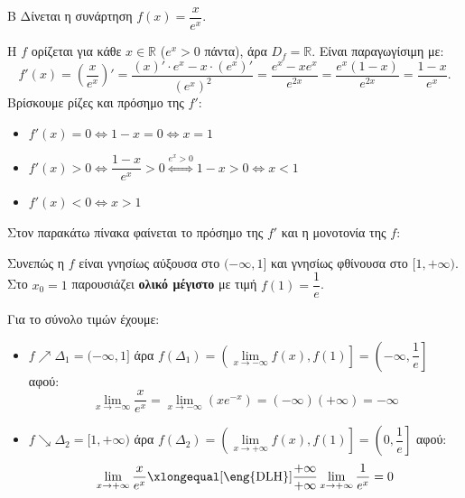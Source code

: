 \begin{thema}{Β}
Δίνεται η συνάρτηση $f(x)=\dfrac{x}{e^x}$.

\begin{erwthma}

\item Η $f$ ορίζεται για κάθε $x\in\mathbb{R}$ ($e^x>0$ πάντα), άρα $D_f=\mathbb{R}$.
Είναι παραγωγίσιμη με:
\[
f'(x)=\left(\frac{x}{e^x}\right)'=\frac{(x)'\cdot e^x-x\cdot(e^x)'}{(e^x)^2}
=\frac{e^x-xe^x}{e^{2x}}=\frac{e^x(1-x)}{e^{2x}}=\frac{1-x}{e^x}.
\]
Βρίσκουμε ρίζες και πρόσημο της $f'$:
\begin{itemize}
    \item $f'(x)=0\Leftrightarrow 1-x=0\Leftrightarrow x=1$
    \item $f'(x)>0\Leftrightarrow \dfrac{1-x}{e^x}>0\stackrel{e^x>0}{\Leftrightarrow}1-x>0\Leftrightarrow x<1$
    \item $f'(x)<0\Leftrightarrow x>1$
\end{itemize}
Στον παρακάτω πίνακα φαίνεται το πρόσημο της $f'$ και η μονοτονία της $f$:
\begin{center}
\end{center}
Συνεπώς η $f$ είναι γνησίως αύξουσα στο $(-\infty,1]$ και γνησίως φθίνουσα στο $[1,+\infty)$.
Στο $x_0=1$ παρουσιάζει \textbf{ολικό μέγιστο} με τιμή $f(1)=\dfrac{1}{e}$.

Για το σύνολο τιμών έχουμε:
\begin{itemize}
\item $f\nearrow\varDelta_1=(-\infty,1]$ άρα $f(\varDelta_1)=\left(\lim\limits_{x\to -\infty}{f(x)},f(1)\right]=\left(-\infty,\dfrac{1}{e}\right]$ αφού:
\[\lim\limits_{x\to-\infty}\dfrac{x}{e^x}=\lim\limits_{x\to -\infty}{\left(xe^{-x}\right)}=(-\infty)(+\infty)=-\infty\] 
\item $f\searrow\varDelta_2=[1,+\infty)$ άρα $f(\varDelta_2)=\left(\lim\limits_{x\to +\infty}{f(x)},f(1)\right]=\left(0,\dfrac{1}{e}\right]$ αφού:
\[ \lim\limits_{x\to+\infty}\dfrac{x}{e^x}\xlongequal[\text{\eng{DLH}}]{\frac{+\infty}{+\infty}}\lim\limits_{x\to +\infty}{\dfrac{1}{e^x}}=0\]
\end{itemize}


\end{erwthma}
\end{thema}
